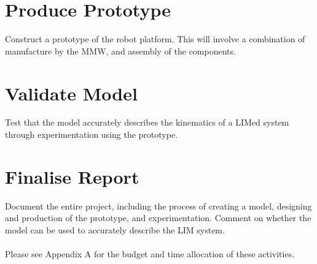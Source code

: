 \section{Produce Prototype}
Construct a prototype of the robot platform. This will involve a combination of manufacture by the MMW, and assembly of the components.

\section{Validate Model}
Test that the model accurately describes the kinematics of a LIMed system through experimentation using the prototype.

\section{Finalise Report}
Document the entire project, including the process of creating a model, designing and production of the prototype, and experimentation. Comment on whether the model can be used to accurately describe the LIM system.\\\\

\noindent Please see Appendix A for the budget and time allocation of these activities.